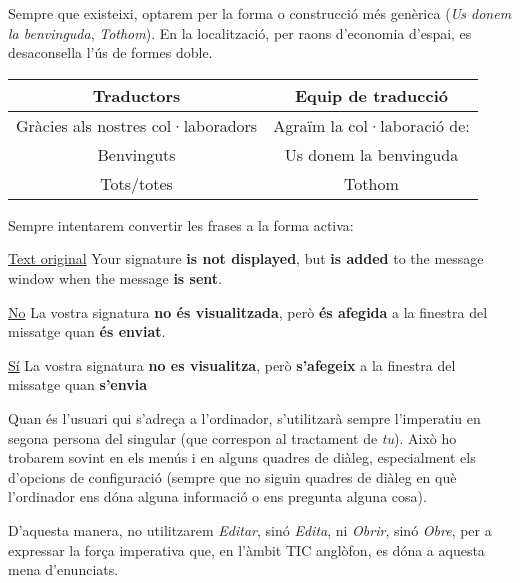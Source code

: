 \documentclass[9pt]{cheatsheet}
\begin{document}
\begin{multicols*}{3}



Sempre que existeixi, optarem per la forma o construcció més genèrica (\emph{Us donem la benvinguda}, \emph{Tothom}). En la localització, per raons d’economia d’espai, es desaconsella l’ús de formes doble.

\begin{tabular}{| c | c |}
 \hline
 Traductors & Equip de traducció \\
 \hline
 Gràcies als nostres col·laboradors & Agraïm la col·laboració de: \\
 \hline
 Benvinguts & Us donem la benvinguda \\
 \hline
 Tots/totes & Tothom \\
 \hline
\end{tabular}


Sempre intentarem convertir les frases a la forma activa:

\underline {Text original} Your signature \textbf{is not displayed}, but \textbf{is added} to the message window when the message \textbf{is sent}.

\underline {No} La vostra signatura \textbf{no és visualitzada}, però \textbf{és afegida} a la finestra del missatge quan \textbf{és enviat}.

\underline {Sí} La vostra signatura \textbf{no es visualitza}, però \textbf{s'afegeix} a la finestra del missatge quan \textbf{s'envia}




Quan és l’usuari qui s'adreça a l'ordinador, s'utilitzarà sempre l’imperatiu en segona persona del singular (que correspon al tractament de \emph{tu}). Això ho trobarem sovint en els menús i en alguns quadres de diàleg, especialment els d’opcions de configuració (sempre que no siguin quadres de diàleg en què l’ordinador ens dóna alguna informació o ens pregunta alguna cosa).

D’aquesta manera, no utilitzarem \emph{Editar}, sinó \emph{Edita}, ni \emph{Obrir}, sinó \emph{Obre}, per a expressar la força imperativa que, en l’àmbit TIC anglòfon, es dóna a aquesta mena d’enunciats.



\end{multicols*}
\end{document}
